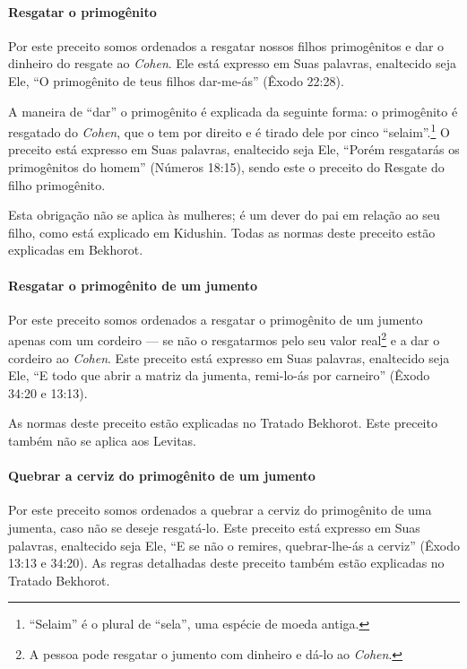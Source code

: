 \paragraph{Resgatar o primogênito}

Por este preceito somos ordenados a resgatar nossos filhos primogênitos
e dar o dinheiro do resgate ao \textit{Cohen}. Ele está expresso em Suas
palavras, enaltecido seja Ele, ``O primogênito de teus filhos dar-me-ás'' (Êxodo 22:28).

A maneira de ``dar'' o primogênito é explicada da seguinte forma: o
primogênito é resgatado do \textit{Cohen}, que o tem por direito e é tirado
dele por cinco ``selaim''.\footnote{``Selaim'' é o plural de ``sela'', uma espécie de moeda antiga.} O preceito está expresso em Suas palavras, enaltecido seja Ele, ``Porém
resgatarás os primogênitos do homem'' (Números 18:15), sendo este o
preceito do Resgate do filho primogênito.

Esta obrigação não se aplica às mulheres; é um dever do pai em relação
ao seu filho, como está explicado em Kidushin. Todas as normas deste
preceito estão explicadas em Bekhorot.

\paragraph{Resgatar o primogênito de um jumento}

Por este preceito somos ordenados a resgatar o primogênito de um jumento
apenas com um cordeiro --- se não o resgatarmos pelo seu valor
real\footnote{A pessoa pode resgatar o jumento com dinheiro e dá-lo ao \textit{Cohen}.} e a dar o cordeiro ao \textit{Cohen}. Este
preceito está expresso em Suas palavras,
enaltecido seja Ele, ``E todo que abrir a matriz da jumenta, remi-lo-ás
por carneiro'' (Êxodo 34:20 e 13:13).

As normas deste preceito estão explicadas no Tratado Bekhorot. Este
preceito também não se aplica aos Levitas.

\paragraph{Quebrar a cerviz do primogênito de um jumento}

Por este preceito somos ordenados a quebrar a cerviz do primogênito de
uma jumenta, caso não se deseje resgatá-lo. Este preceito está expresso
em Suas palavras, enaltecido seja Ele, ``E se não o remires,
quebrar-lhe-ás a cerviz'' (Êxodo 13:13 e 34:20). As regras detalhadas
deste preceito também estão explicadas no Tratado Bekhorot.

